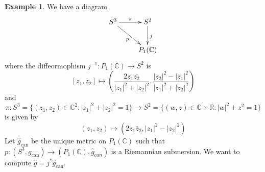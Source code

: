 \documentclass{amsart}
\numberwithin{equation}{section}
\newcommand{\bC}{\mathbb{C}}
\newcommand{\bR}{\mathbb{R}}
\theoremstyle{definition}
\newtheorem{example}[definition]{Example}
\theoremstyle{theorem}
\begin{document}
\begin{example}\label{hopf}
We have a diagram 
\[
\xymatrix{ S^3 \ar[r]^{\pi} \ar[rd]_{p}& S^2 \ar[d]^{j}\\
& P_1(\mathbb{C})
}
\]
where the diffeormophism $j^{-1}: P_1(\mathbb{C}) \to S^2$ is 
\[
[z_1, z_2] \mapsto \left(\frac{2z_1\bar{z_2}}{|z_1|^2 + |z_2|^2}, \frac{|z_2|^2 - |z_1|^2}{|z_1|^2 + |z_2|^2}\right)
\]
and 
$$
\pi : S^3=\{ (z_1,z_2)\in \bC^2: |z_1|^2+|z_2|^2=1\} \to S^2=\{
(w,z)\in \bC\times \bR: |w|^2+z^2=1\}
$$
is given by 
\[
(z_1, z_2) \mapsto (2z_1 \bar{z}_2, |z_1|^2 - |z_2|^2)
\]
Let $\hat{g}_\mathrm{can}$ be the  unique metric on $P_1(\mathbb{C})$ such that 
$p: (S^3,g_\mathrm{can})\to  (P_1(\mathbb{C}), \hat{g}_{can})$ is a Riemannian
submersion. We want to compute $\hat{g}=j^*\hat{g}_\mathrm{can}$.


 


\end{example}
\end{document}

